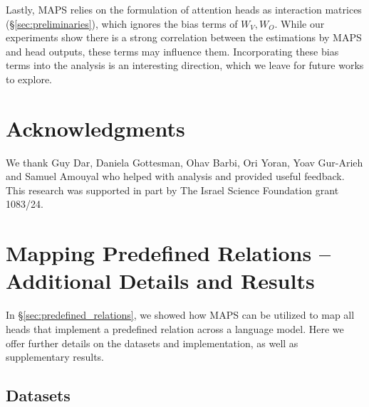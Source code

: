 \documentclass[11pt]{article}
\newcommand{\framework}{\textsc{MAPS}}
\begin{document}
Lastly, \framework{} relies on the formulation of attention heads as interaction matrices (\S\ref{sec:preliminaries}), which ignores the bias terms of $W_V,W_O$. While our experiments show there is a strong correlation between the estimations by \framework{} and head outputs, these terms may influence them. Incorporating these bias terms into the analysis is an interesting direction, which we leave for future works to explore.



\section*{Acknowledgments}
We thank Guy Dar, Daniela Gottesman, Ohav Barbi, Ori Yoran, Yoav Gur-Arieh and Samuel Amouyal who helped with analysis and provided useful feedback.
This research was supported in part by The Israel Science Foundation grant 1083/24.




%



\appendix

\section{Mapping Predefined Relations -- Additional Details and Results}
In \S\ref{sec:predefined_relations}, we showed how \framework{} can be utilized to map all heads that implement a predefined relation across a language model. Here we offer further details on the datasets and implementation, as well as supplementary results. 

\label{appendix:inspecting_predefined_relations}
\subsection{Datasets}
\end{document}
